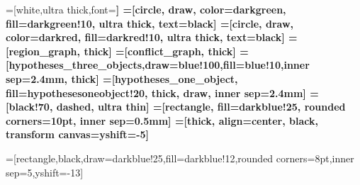 =[white,ultra thick,font=\bfseries]
=[circle, draw, color=darkgreen, fill=darkgreen!10, ultra thick, text=black]
=[circle, draw, color=darkred, fill=darkred!10, ultra thick, text=black]
=[region_graph, thick]
=[conflict_graph, thick]
=[hypotheses_three_objects,draw=blue!100,fill=blue!10,inner sep=2.4mm, thick]
=[hypotheses_one_object, fill=hypothesesoneobject!20, thick, draw, inner
sep=2.4mm]
=[black!70, dashed, ultra thin]
=[rectangle, fill=darkblue!25, rounded corners=10pt, inner sep=0.5mm]
=[thick, align=center, black, transform canvas={yshift=-5}]

=[rectangle,black,draw=darkblue!25,fill=darkblue!12,rounded corners=8pt,inner
sep=5,yshift=-13]






